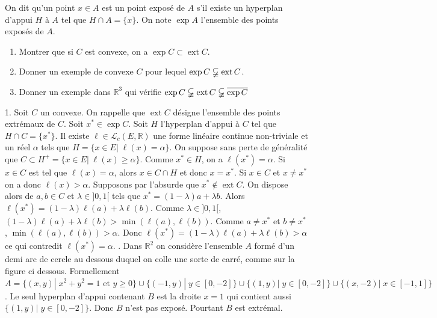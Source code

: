 \documentclass{fancybook}
\DeclareMathOperator{\ext}{ext}
\begin{document}
\begin{exercice}
On dit qu'un point $x\in A$ est un point exposé de $A$ s'il existe un hyperplan d'appui $H$ à $A$ tel que $H\cap A = \{x\}$.\newline
On note $\exp A$ l'ensemble des points exposés de $A$.
\begin{enumerate}
\item Montrer que si $C$ est convexe, on a $\exp C \subset \ext C$.
\item Donner un exemple de convexe $C$ pour lequel $\exp C \varsubsetneqq \ext C$.
\item Donner un exemple dans $\mathbb R^3$ qui vérifie $\exp C \varsubsetneqq \ext C \varsubsetneqq \overline{\exp C}$
\end{enumerate}
\end{exercice}
1. Soit $C$ un convexe. On rappelle que $\ext C$ désigne l'ensemble des points extrémaux de $C$. \newline
Soit $x^*\in \exp C$. Soit $H$ l'hyperplan d'appui à $C$ tel que $H\cap C = \{x^*\}$. Il existe $\ell\in \mathcal L_c(E,\mathbb R)$ une forme linéaire continue non-triviale et un réel $\alpha$ tels que $H=\{x\in E| \; \ell(x)=\alpha\}$. On suppose sans perte de généralité que $C\subset H^+=\{x\in E| \; \ell(x)\geq \alpha\}$.\newline
Comme $x^*\in H$, on a $\ell(x^*)=\alpha$. Si $x\in C$ est tel que $\ell(x)=\alpha$, alors $x\in C\cap H$ et donc $x=x^*$.\newline
Si $x\in C$ et $x\neq x^*$ on a donc $\ell(x)>\alpha$.\newline \newline
Supposons par l'absurde que $x^*\notin \ext C$. On dispose alors de $a,b \in C$ et $\lambda\in ]0,1[$ tels que $x^*=(1-\lambda)a + \lambda b$.\newline
Alors $\ell(x^*)=(1-\lambda)\ell(a) + \lambda \ell(b)$. \newline
Comme $\lambda\in ]0,1[$, $(1-\lambda)\ell(a) + \lambda \ell(b)>\min(\ell(a), \ell(b))$. Comme $a\neq x^*$ et $b\neq x^*$, $\min(\ell(a), \ell(b))>\alpha$.\newline 
Donc $\ell(x^*)=(1-\lambda)\ell(a) + \lambda \ell(b)>\alpha$ ce qui contredit $\ell(x^*)=\alpha$.\newline
{}. Dans $\mathbb R^2$ on considère l'ensemble $A$ formé d'un demi arc de cercle au dessous duquel on colle une sorte de carré, comme sur la figure ci dessous. \newline Formellement $A=\{(x,y)|\; x^2+y^2=1 \text{ et } y\geq 0\}\cup \{(-1,y)|\; y\in [0,-2]\} \cup \{(1,y)|\; y\in [0,-2]\} \cup \{(x,-2)|\; x\in [-1,1]\}$. Le seul hyperplan d'appui contenant $B$ est la droite $x=1$ qui contient aussi $\{(1,y)|\; y\in [0,-2]\}$. Donc $B$ n'est pas exposé.\newline
Pourtant $B$ est extrémal. \newline 
\end{document}
